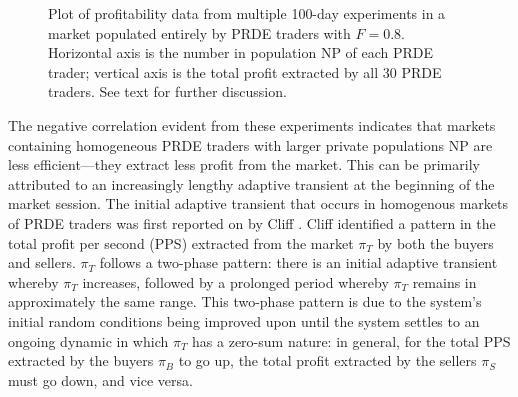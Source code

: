\documentclass[conference]{IEEEtran}
\begin{document}
\begin{figure}[htbp]
    \centering
    \caption{
        Plot of profitability data from multiple 100-day experiments in a market populated entirely by PRDE traders with $F=0.8$.
        Horizontal axis is the number in population $\mathrm{NP}$ of each PRDE trader; vertical axis is the total profit extracted by all 30 PRDE traders.
        See text for further discussion.
    }
    \label{NP_profit}
\end{figure}

The negative correlation evident from these experiments indicates that markets containing homogeneous PRDE traders with larger private populations $\mathrm{NP}$ are less efficient---they extract less profit from the market.
This can be primarily attributed to an increasingly lengthy adaptive transient at the beginning of the market session.
The initial adaptive transient that occurs in homogenous markets of PRDE traders was first reported on by Cliff \cite{PRDE}.
Cliff identified a pattern in the total profit per second (PPS) extracted from the market $\pi_T$ by both the buyers and sellers.
$\pi_T$ follows a two-phase pattern: there is an initial adaptive transient whereby $\pi_T$ increases, followed by a prolonged period whereby $\pi_T$ remains in approximately the same range.
This two-phase pattern is due to the system's initial random conditions being improved upon until the system settles to an ongoing dynamic in which $\pi_T$ has a zero-sum nature: in general, for the total PPS extracted by the buyers $\pi_B$ to go up, the total profit extracted by the sellers $\pi_S$ must go down, and vice versa.
\end{document}
